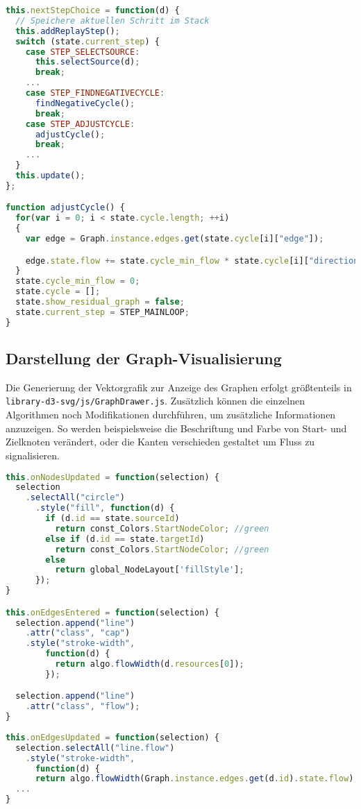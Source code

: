 \begin{lstlisting}[caption=Schrittweise Ausführung des Algorithmus, language=Javascript]
this.nextStepChoice = function(d) {
  // Speichere aktuellen Schritt im Stack
  this.addReplayStep();
  switch (state.current_step) {
    case STEP_SELECTSOURCE:
      this.selectSource(d);
      break; 
    ...   
    case STEP_FINDNEGATIVECYCLE:
      findNegativeCycle();
      break;
    case STEP_ADJUSTCYCLE:
      adjustCycle();
      break;
    ...
  }
  this.update();
};

function adjustCycle() {
  for(var i = 0; i < state.cycle.length; ++i)
  {
    var edge = Graph.instance.edges.get(state.cycle[i]["edge"]);

    edge.state.flow += state.cycle_min_flow * state.cycle[i]["direction"];
  }
  state.cycle_min_flow = 0;
  state.cycle = [];
  state.show_residual_graph = false;
  state.current_step = STEP_MAINLOOP; 
}
\end{lstlisting}

\subsection{Darstellung der Graph-Visualisierung}

Die Generierung der Vektorgrafik zur Anzeige des Graphen erfolgt größtenteils in \texttt{library-d3-svg/js/GraphDrawer.js}. Zusätzlich können die einzelnen Algorithmen noch Modifikationen durchführen, um zusätzliche Informationen anzuzeigen. So werden beispielsweise die Beschriftung und Farbe von Start- und Zielknoten verändert, oder die Kanten verschieden gestaltet um Fluss zu signalisieren.

\begin{lstlisting}[caption=Algorithmus-spezifische Visualisierung, language=Javascript]
this.onNodesUpdated = function(selection) {
  selection
    .selectAll("circle")
      .style("fill", function(d) {
        if (d.id == state.sourceId)
          return const_Colors.StartNodeColor; //green
        else if (d.id == state.targetId)
          return const_Colors.StartNodeColor; //green
        else
          return global_NodeLayout['fillStyle'];
      });
}

this.onEdgesEntered = function(selection) {
  selection.append("line")
    .attr("class", "cap")
    .style("stroke-width",
        function(d) {
          return algo.flowWidth(d.resources[0]);
        });

  selection.append("line")
    .attr("class", "flow");
}
  
this.onEdgesUpdated = function(selection) {
  selection.selectAll("line.flow")
    .style("stroke-width",
      function(d) {
      return algo.flowWidth(Graph.instance.edges.get(d.id).state.flow); });      
  ...
}
\end{lstlisting}

